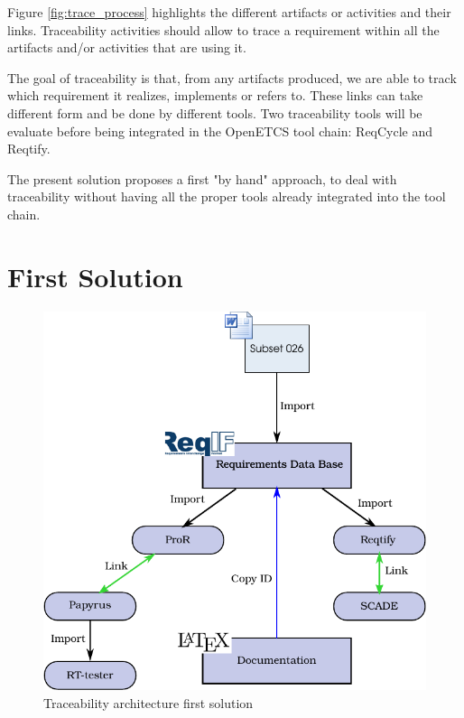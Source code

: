 \documentclass[11pt]{template/openetcs_report}
\begin{document}
Figure  \ref{fig:trace_process} highlights the different artifacts or activities and their
links. Traceability activities should allow to trace a requirement within all
the artifacts and/or activities that are using it.

The goal of traceability is that, from any artifacts produced, we are able to
track which requirement it realizes, implements  or refers to. These links can
take different form and be done by different tools. 
Two traceability tools will be evaluate before being integrated in the OpenETCS tool chain:
ReqCycle and Reqtify.

The present solution proposes a first "by hand" approach, to deal with
traceability without having all the proper tools already integrated into the tool chain.

\section{First Solution}
\label{sec-1-1}
\begin{figure}[htb]
\centering
\includegraphics[width=.9\linewidth]{images/first_trace_solution.pdf}
\caption{\label{fig:trace_first}Traceability architecture first solution}
\end{figure}
\end{document}
